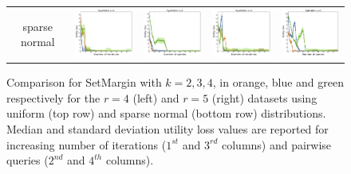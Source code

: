 \documentclass{article}
\renewcommand\[{\begin{equation}}
\renewcommand\]{\end{equation}}
\begin{document}
\begin{figure}[t]
{\begin{tabular}{ccccc}
        \hline
        {\sc sparse normal} &        
        \includegraphics[align=c,width=10em]{figures/synthetic_vs_self_4_normal_sparse_per_iter_loss} &
        \includegraphics[align=c,width=10em]{figures/synthetic_vs_self_4_normal_sparse_per_query_loss} &
        \includegraphics[align=c,width=10em]{figures/synthetic_vs_self_5_normal_sparse_per_iter_loss} &
        \includegraphics[align=c,width=10em]{figures/synthetic_vs_self_5_normal_sparse_per_query_loss}
        \\
     \end{tabular}
    }
    \caption{\label{fig:selfcomparison} Comparison for {\sc SetMargin}
      with $k=2,3,4$, in orange, blue and green respectively for the
      $r=4$ (left) and $r=5$ (right) datasets using uniform (top row) and sparse normal (bottom row) distributions. Median and standard deviation utility loss values are reported for increasing number of iterations ($1^{st}$ and $3^{rd}$ columns) and pairwise queries ($2^{nd}$ and $4^{th}$ columns).}
\end{figure}
\end{document}
